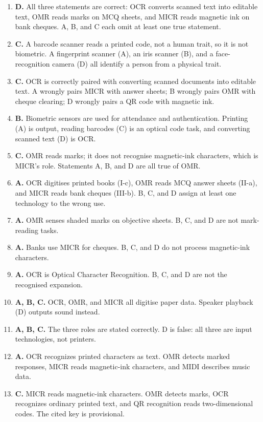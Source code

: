\begin{enumerate}[label=\textbf{Q\arabic*.}, leftmargin=*]
  barcode (A), a QR code (B), and OCR of a printed page (D) all require the
  reader to see the pattern.
\item \textbf{D.} All three statements are correct: OCR converts scanned
  text into editable text, OMR reads marks on MCQ sheets, and MICR reads
  magnetic ink on bank cheques. A, B, and C each omit at least one true
  statement.
\item \textbf{C.} A barcode scanner reads a printed code, not a human
  trait, so it is not biometric. A fingerprint scanner (A), an iris scanner
  (B), and a face-recognition camera (D) all identify a person from a
  physical trait.
\item \textbf{C.} OCR is correctly paired with converting scanned documents
  into editable text. A wrongly pairs MICR with answer sheets; B wrongly
  pairs OMR with cheque clearing; D wrongly pairs a QR code with magnetic
  ink.
\item \textbf{B.} Biometric sensors are used for attendance and
  authentication. Printing (A) is output, reading barcodes (C) is an optical
  code task, and converting scanned text (D) is OCR.
\item \textbf{C.} OMR reads marks; it does not recognise magnetic-ink
  characters, which is MICR's role. Statements A, B, and D are all true of
  OMR.
\item \textbf{A.} OCR digitises printed books (I-c), OMR reads MCQ answer
  sheets (II-a), and MICR reads bank cheques (III-b). B, C, and D assign at
  least one technology to the wrong use.

\item \textbf{A.} OMR senses shaded marks on objective sheets. B, C, and D are not mark-reading tasks.
\item \textbf{A.} Banks use MICR for cheques. B, C, and D do not process magnetic-ink characters.
\item \textbf{A.} OCR is Optical Character Recognition. B, C, and D are not the recognised expansion.
\item \textbf{A, B, C.} OCR, OMR, and MICR all digitise paper data. Speaker playback (D) outputs sound instead.
\item \textbf{A, B, C.} The three roles are stated correctly. D is false: all three are input technologies, not printers.
\item \textbf{A.} OCR recognizes printed characters as text. OMR detects marked responses, MICR reads magnetic-ink characters, and MIDI describes music data.

\item \textbf{C.} MICR reads magnetic-ink characters. OMR detects marks, OCR recognizes ordinary printed text, and QR recognition reads two-dimensional codes. The cited key is provisional.


\end{enumerate}
